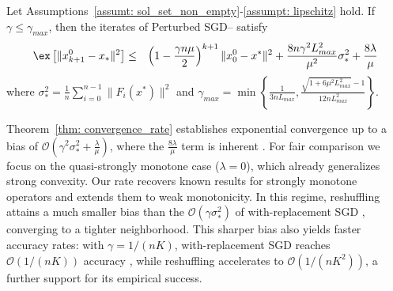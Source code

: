 \begin{theorem}\label{thm: convergence_rate}
    Let Assumptions~\ref{assumt: sol_set_non_empty}-\ref{assumpt: lipschitz} hold. If $\gamma \leq \gamma_{max}$, 
    then the iterates of {Perturbed SGD–\RRresh} satisfy \vspace{-0.5em}
    \begin{eqnarray}
        \ex\left[\|x_{k+1}^0 - x_*\|^2\right] &\leq& \left(1 - \frac{\gamma  n\mu}{2}\right)^{k+1} \|x^0_0 - x^*\|^2 + \frac{8 n \gamma^2 L_{max}^2}{\mu^2} \sigma_*^2 + \frac{8\lambda}{\mu} \nonumber
    \end{eqnarray}\vspace{-0.5em}
   where  $\sigma_*^2 = \frac{1}{n} \sum_{i=0}^{n-1} \|F_i(x^*)\|^2$ and $\gamma_{max} = \min\left\{\frac{1}{3nL_{max}}, \frac{\sqrt{1+6 \mu^2 L_{max}^2} -1}{12nL_{max}^2}\right\}$.
\end{theorem}
\begin{draftremark}
Theorem~\ref{thm: convergence_rate} establishes exponential convergence up to a bias of $\mathcal{O}(\gamma^2\sigma_*^2 + \tfrac{\lambda}{\mu})$, where the $\tfrac{8\lambda}{\mu}$ term is inherent \citep{yu2021analysis}. For fair comparison we focus on the quasi-strongly monotone case ($\lambda=0$), which already generalizes strong convexity. Our rate recovers known results for strongly monotone operators \citep{das2022sampling,emmanouilidis2024stochastic} and extends them to weak monotonicity.
In this regime, reshuffling attains a much smaller bias than the $\mathcal{O}(\gamma\sigma_*^2)$ of with-replacement SGD \citep{loizou2020stochastic,gower2019sgd}, converging to a tighter neighborhood. This sharper bias also yields faster accuracy rates: with $\gamma = 1/(nK)$, with-replacement SGD reaches $\mathcal{O}(1/(nK))$ accuracy \citep{das2022sampling,mishchenko2020random}, while reshuffling accelerates to $\mathcal{O}(1/(nK^2))$, a further  support for its empirical success.
\end{draftremark}

